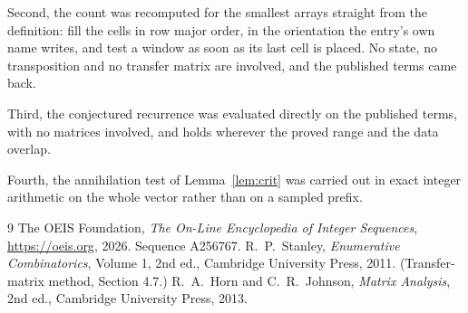 \documentclass[11pt,a4paper]{article}
\theoremstyle{plain}
\theoremstyle{definition}
\begin{document}
Second, the count was recomputed for the smallest arrays straight from the definition: fill the
cells in row major order, in the orientation the entry's own name writes, and test a window as
soon as its last cell is placed. No state, no transposition and no transfer matrix are
involved, and the published terms came back.

Third, the conjectured recurrence was evaluated directly on the published terms, with no
matrices involved, and holds wherever the proved range and the data overlap.

Fourth, the annihilation test of Lemma~\ref{lem:crit} was carried out in exact integer
arithmetic on the whole vector rather than on a sampled prefix.

\begin{thebibliography}{9}
 The OEIS Foundation, \emph{The On-Line Encyclopedia of Integer
Sequences}, \url{https://oeis.org}, 2026. Sequence A256767.
 R.~P.~Stanley, \emph{Enumerative Combinatorics}, Volume 1, 2nd ed.,
Cambridge University Press, 2011. (Transfer-matrix method, Section 4.7.)
 R.~A.~Horn and C.~R.~Johnson, \emph{Matrix Analysis}, 2nd ed., Cambridge
University Press, 2013.
\end{thebibliography}
\end{document}

